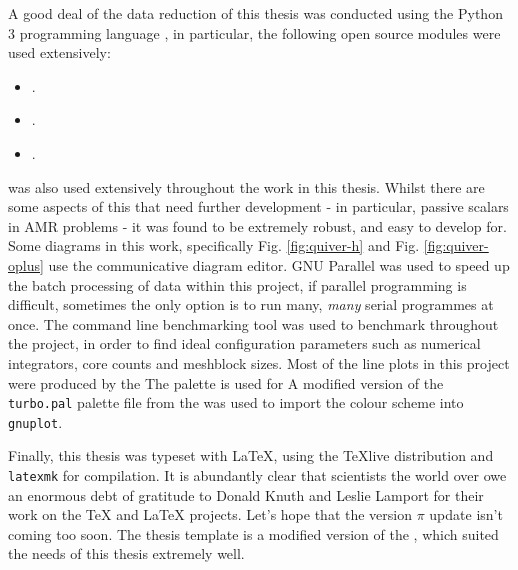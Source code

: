 A good deal of the data reduction of this thesis was conducted using the Python 3 programming language \parencite{10.5555/1593511}, in particular, the following open source modules were used extensively:

\begin{itemize}
  \item {} \parencite{harris2020array}.
  \item {} \parencite{astropy:2013,astropy:2018}.
  \item {} \parencite{Hunter:2007}.
\end{itemize}

\athena{} \parencite{athena} was also used extensively throughout the work in this thesis.
Whilst there are some aspects of this that need further development - in particular, passive scalars in AMR problems - it was found to be extremely robust, and easy to develop for.
Some diagrams in this work, specifically Fig. \ref{fig:quiver-h} and Fig. \ref{fig:quiver-oplus} use the  communicative diagram editor.
GNU Parallel \parencite{tange_2021_5523272} was used to speed up the batch processing of data within this project, if parallel programming is difficult, sometimes the only option is to run many, \textit{many} serial programmes at once.
The  command line benchmarking tool was used to benchmark \athena{} throughout the project, in order to find ideal configuration parameters such as numerical integrators, core counts and meshblock sizes.
Most of the line plots in this project were produced by the 
The  palette is used for
A modified version of the \texttt{turbo.pal} palette file from the  was used to import the colour scheme into \texttt{gnuplot}.

Finally, this thesis was typeset with \LaTeX{}, using the {\TeX}live distribution and \texttt{latexmk} for compilation.
It is abundantly clear that scientists the world over owe an enormous debt of gratitude to Donald Knuth and Leslie Lamport for their work on the \TeX{} and \LaTeX{} projects.
Let's hope that the version $\pi$ update isn't coming too soon.
The thesis template is a modified version of the , which suited the needs of this thesis extremely well.

